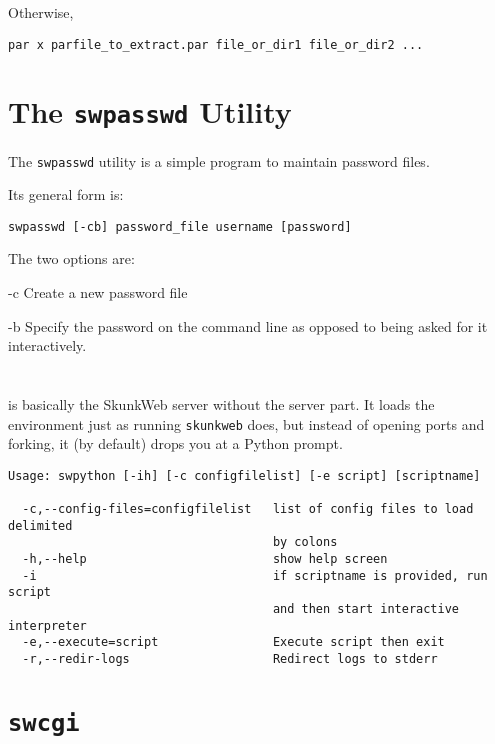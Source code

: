 \documentclass[titlepage]{manual}
\begin{document}
Otherwise,
\begin{verbatim}
par x parfile_to_extract.par file_or_dir1 file_or_dir2 ...
\end{verbatim}


\section{The \texttt{swpasswd} Utility}
\label{swpasswd}
The \texttt{swpasswd} utility is a simple program to maintain
password files.  

Its general form is:
\begin{verbatim}
swpasswd [-cb] password_file username [password]
\end{verbatim}

The two options are:
\begin{argdesc}
\item[-c] Create a new password file
\item[-b] Specify the password on the command line as opposed to being
asked for it interactively.
\end{argdesc}


\section{\swpython}
\label{swpython}
\index{\swpython}
\swpython is basically the SkunkWeb server without the server part.  It
loads the environment just as running \texttt{skunkweb} does, but instead
of opening ports and forking, it (by default) drops you at a Python prompt.

\begin{verbatim}
Usage: swpython [-ih] [-c configfilelist] [-e script] [scriptname]

  -c,--config-files=configfilelist   list of config files to load delimited
                                     by colons
  -h,--help                          show help screen
  -i                                 if scriptname is provided, run script
                                     and then start interactive interpreter
  -e,--execute=script                Execute script then exit
  -r,--redir-logs                    Redirect logs to stderr
\end{verbatim}

\section{\texttt{swcgi}}
\label{swcgi}
\end{document}
